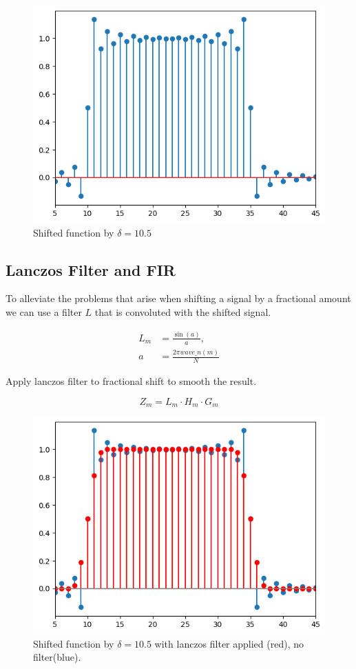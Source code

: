 \documentclass[]{usiinfbachelorproject}
\begin{document}
	
	\begin{figure}[h]
		\centering
		\includegraphics[width=0.5\columnwidth]{images/box_shifted_delta10_1_n50.png}
		\caption{Shifted function by $\delta=10.5$}
	\end{figure}
	
	\subsection{Lanczos Filter and FIR}
	To alleviate the problems that arise when shifting a signal by a fractional amount we can use a filter $L$ that is convoluted with the shifted signal.
	
	\begin{align*}
		L_m &= \frac{\sin(a)}{a},\\
		a &= \frac{2\pi wave\_n(m)}{N}
	\end{align*}
	
	Apply lanczos filter to fractional shift to smooth the result.
	
	\begin{equation*}
		Z_m = L_m \cdot H_m \cdot G_m
	\end{equation*}
	
	\begin{figure}[h]
		\centering
		\includegraphics[width=0.5\columnwidth]{images/box_shifted_lanczos_delta10_1_n50.png}
		\caption{Shifted function by $\delta=10.5$ with lanczos filter applied (red), no filter(blue).}
	\end{figure}
	
	\fi
	
\end{document}
